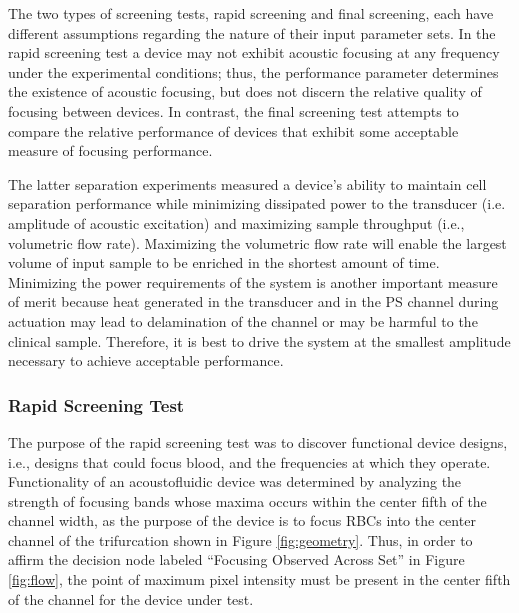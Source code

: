 The two types of screening tests, rapid screening and final screening, each have different assumptions regarding the nature of their input parameter sets. In the rapid screening test a device may not exhibit acoustic focusing at any frequency under the experimental conditions; thus, the performance parameter determines the existence of acoustic focusing, but does not discern the relative quality of focusing between devices.  In contrast, the final screening test attempts to compare the relative performance of devices that exhibit some acceptable measure of focusing performance. 

The latter separation experiments measured a device's ability to maintain cell separation performance while minimizing dissipated power to the transducer (i.e. amplitude of acoustic excitation) and maximizing sample throughput (i.e., volumetric flow rate). Maximizing the volumetric flow rate will enable the largest volume of input sample to be enriched in the shortest amount of time. Minimizing the power requirements of the system is another important measure of merit because heat generated in the transducer and in the PS channel during actuation may lead to delamination of the channel or may be harmful to the clinical sample. Therefore, it is best to drive the system at the smallest amplitude necessary to achieve acceptable performance. 

\subsubsection{Rapid Screening Test}
\label{sssec:rapidScreen}

The purpose of the rapid screening test was to discover functional device designs, i.e., designs that could focus blood, and the frequencies at which they operate. Functionality of an acoustofluidic device was determined by analyzing the strength of focusing bands whose maxima occurs within the center fifth of the channel width, as the purpose of the device is to focus RBCs into the center channel of the trifurcation shown in Figure \ref{fig:geometry}. Thus, in order to affirm the decision node labeled ``Focusing Observed Across Set'' in Figure \ref{fig:flow}, the point of maximum pixel intensity must be present in the center fifth of the channel for the device under test. 

